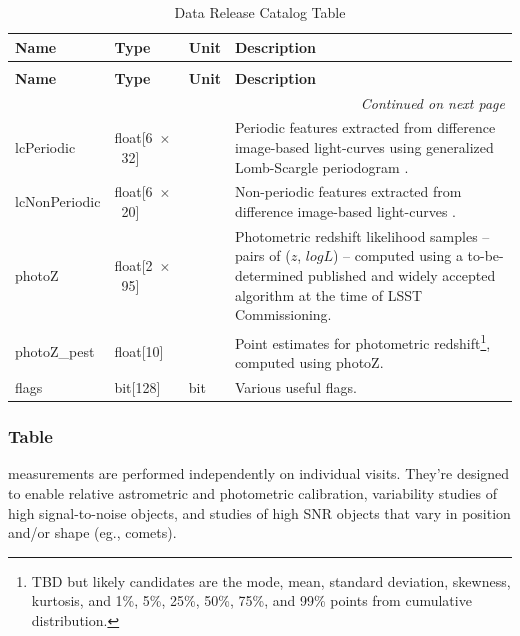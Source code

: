 \documentclass[SE,lsstdraft,toc]{lsstdoc}
\newcommand\x         {\hbox{$\times$}}
\newenvironment{schema}[3]{%
\setlength\LTleft{0pt}
\setlength\LTright{\fill}
\begin{longtable}{p{0.2\textwidth}p{0.14\textwidth}p{0.14\textwidth}p{0.41\textwidth}}

\caption[#1]{#2\label{#3}}\\

\hline \textbf{Name} & \textbf{Type} & \textbf{Unit} & \textbf{Description}\\ \hline
\endfirsthead

\caption[#1]{#2}\\

\hline \textbf{Name} & \textbf{Type} & \textbf{Unit} & \textbf{Description}\\ \hline
\endhead

\hline \multicolumn{4}{r}{\emph{Continued on next page}} \\
\endfoot

\hline\hline
\endlastfoot
}{%
\hline
\end{longtable}
}
\begin{document}
\begin{schema}{\Object Table}{Data Release Catalog \Object Table}{tbl:objectTable}
lcPeriodic & float[6~\x~32] & ~ & Periodic features extracted from difference image-based light-curves using generalized Lomb-Scargle periodogram \citep[Table~4,][]{2011ApJ...733...10R}.\\

lcNonPeriodic & float[6~\x~20] & ~ & Non-periodic features extracted from difference image-based light-curves \citep[Table~5,][]{2011ApJ...733...10R}. \\


photoZ & float[2~\x~95] & ~ & Photometric redshift likelihood samples -- pairs of ($z$, $logL$) -- computed using a to-be-determined published and widely accepted algorithm at the time of LSST Commissioning. \\

photoZ\_pest & float[10] & ~ & Point estimates for photometric redshift\footnote{TBD but likely candidates
are the mode, mean, standard deviation, skewness, kurtosis, and 1\%, 5\%, 25\%, 50\%, 75\%, and 99\% points
from cumulative distribution.}, computed using photoZ. \\

flags & bit[128] & bit & Various useful flags. \\
\end{schema}


\subsubsection{\Source Table}
\label{sec:sourceTable}

\Source measurements are performed independently on individual visits. They're designed to enable relative astrometric and photometric calibration, variability studies of high signal-to-noise objects, and studies of high SNR objects that vary in position and/or shape (eg., comets).
\end{document}
